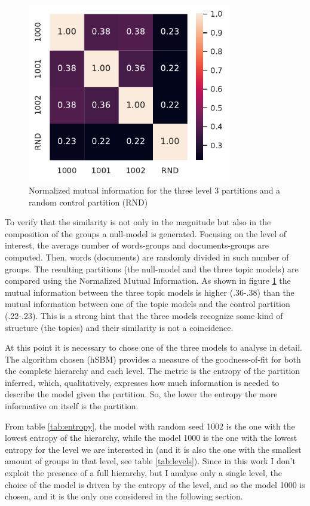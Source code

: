 \documentclass[a4paper, 11pt, headings=standardclasses, tablecaptionsbelow]{scrartcl}
\begin{document}
\begin{figure}[tb]
  \centering
  \includegraphics[width=3.5in]{src/mi.pdf}
  \caption[Mutual Information for the level of interest]{Normalized mutual information for the three level 3 partitions and a random control partition (RND)}
  \label{fig:mi}
\end{figure}

To verify that the similarity is not only in the magnitude but also in the composition of the groups a null-model is generated. Focusing on the level of interest, the average number of words-groups and documents-groups are computed. Then, words (documents) are randomly divided in such number of groups. The resulting partitions (the null-model and the three topic models) are compared using the Normalized Mutual Information. As shown in figure \ref{fig:mi} the mutual information between the three topic models is higher (.36-.38) than the mutual information between one of the topic models and the control partition (.22-.23). This is a strong hint that the three models recognize some kind of structure (the topics) and their similarity is not a coincidence.



At this point it is necessary to chose one of the three models to analyse in detail. The algorithm chosen (hSBM) provides a measure of the goodness-of-fit for both the complete hierarchy and each level. The metric is the entropy of the partition inferred, which, qualitatively, expresses how much information is needed to describe the model given the partition. So, the lower the entropy the more informative on itself is the partition.

From table \ref{tab:entropy}, the model with random seed 1002 is the one with the lowest entropy of the hierarchy, while the model 1000 is the one with the lowest entropy for the level we are interested in (and it is also the one with the smallest amount of groups in that level, see table \ref{tab:levels}). Since in this work I don't exploit the presence of a full hierarchy, but I analyse only a single level, the choice of the model is driven by the entropy of the level, and so the model 1000 is chosen, and it is the only one considered in the following section.
\end{document}

